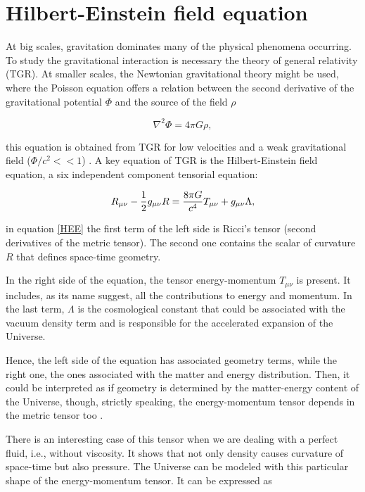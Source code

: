 \section{Hilbert-Einstein field equation}

At big scales, gravitation dominates many of the physical phenomena occurring. 
To study the gravitational interaction is necessary the theory of general relativity (TGR).
At smaller scales, the Newtonian gravitational theory might be used, where
the Poisson equation offers a relation between the second derivative of the
gravitational potential $\Phi$ and the source of the field $\rho$

\[ \nabla^2\Phi=4\pi G\rho ,\]

this equation is obtained from TGR for low velocities and 
a weak gravitational field ($\Phi/c^2<< 1$) \cite{padma}. A key equation of TGR is
the Hilbert-Einstein field equation, a six independent component tensorial 
equation:

\begin{equation}
R_{\mu\nu}-\frac{1}{2}g_{\mu\nu}R = \frac{8\pi G}{c^4}T_{\mu\nu} + g_{\mu\nu}\Lambda ,
\label{HEE}
\end{equation}

in equation \ref{HEE} the first term of the left side is Ricci's tensor 
(second derivatives of the metric tensor). 
The second one contains the scalar of curvature $R$ that defines space-time geometry. 

In the right side of the equation, the tensor energy-momentum $T_{\mu\nu}$ is present.
It includes, as its name suggest, all the contributions to energy and momentum. 
In the last term, $\Lambda$ is the cosmological constant that could be associated with
the vacuum density term and is responsible for the accelerated expansion of the Universe.  

Hence, the left side of the equation has associated geometry terms, 
while the right one, the ones associated with the matter and energy distribution. 
Then, it could be interpreted as if geometry is determined by the matter-energy content 
of the Universe, though, strictly speaking, the energy-momentum tensor depends
in the metric tensor too \cite{padma}. 

There is an interesting case of this tensor when we are dealing with a perfect 
fluid, i.e., without viscosity. It shows that not only density causes curvature of space-time 
but also pressure. The Universe can be modeled with this particular
shape of the energy-momentum tensor. It can be expressed as 

